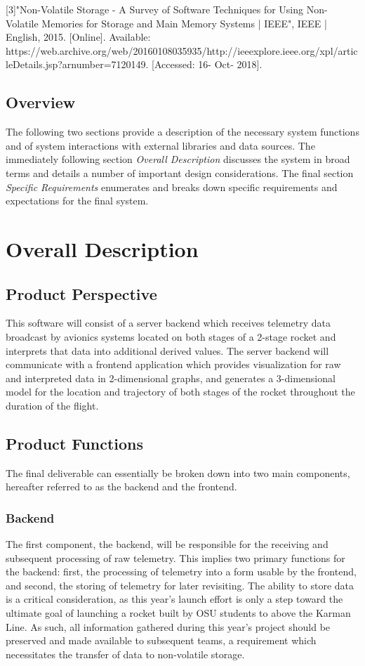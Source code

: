 \documentclass[onecolumn, draftclsnofoot,10pt, compsoc]{IEEEtran}
\begin{document}
			[3]"Non-Volatile Storage - A Survey of Software Techniques for Using Non-Volatile Memories for Storage and Main Memory Systems | IEEE", IEEE | English, 2015. [Online]. Available: https://web.archive.org/web/20160108035935/http://ieeexplore.ieee.org/xpl/articleDetails.jsp?arnumber=7120149. [Accessed: 16- Oct- 2018].\\


		\subsection{Overview}
			The following two sections provide a description of the necessary system functions and of system interactions with external libraries and data sources.
			The immediately following section \textit{Overall Description} discusses the system in broad terms and details a number of important design considerations. 
			The final section \textit{Specific Requirements} enumerates and breaks down specific requirements and expectations for the final system.


	\newpage
	\section{Overall Description}
		\subsection{Product Perspective}
			This software will consist of a server backend which receives telemetry data broadcast by avionics systems located on both stages of a 2-stage rocket and interprets that data into additional derived values. 
			The server backend will communicate with a frontend application which provides visualization for raw and interpreted data in 2-dimensional graphs, and generates a 3-dimensional model for the location and trajectory of both stages of the rocket throughout the duration of the flight.

		\subsection{Product Functions}
			The final deliverable can essentially be broken down into two main components, hereafter referred to as the backend and the frontend.
			\subsubsection{Backend}
			The first component, the backend, will be responsible for the receiving and subsequent processing of raw telemetry.
			This implies two primary functions for the backend: first, the processing of telemetry into a form usable by the frontend, and second, the storing of telemetry for later revisiting.
			The ability to store data is a critical consideration, as this year's launch effort is only a step toward the ultimate goal of launching a rocket built by OSU students to above the Karman Line.
			As such, all information gathered during this year's project should be preserved and made available to subsequent teams, a requirement which necessitates the transfer of data to non-volatile storage.
\end{document}
